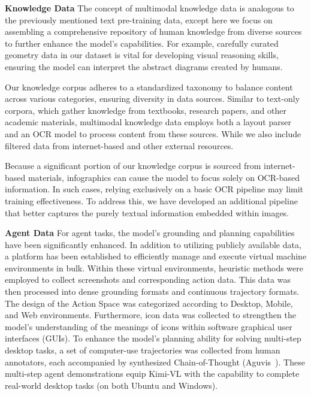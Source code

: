 \documentclass{article}
\newcommand{\ourname}{{Kimi-VL}}
\newcommand{\citep}[1]{\parencite{#1}}
\begin{document}
\textbf{Knowledge Data} The concept of multimodal knowledge data is analogous to the previously mentioned text pre-training data, except here we focus on assembling a comprehensive repository of human knowledge from diverse sources to further enhance the model's capabilities. 
For example, carefully curated geometry data in our dataset is vital for developing visual reasoning skills, ensuring the model can interpret the abstract diagrams created by humans.

Our knowledge corpus adheres to a standardized taxonomy to balance content across various categories, ensuring diversity in data sources. Similar to text-only corpora, which gather knowledge from textbooks, research papers, and other academic materials, multimodal knowledge data employs both a layout parser and an OCR model to process content from these sources. While we also include filtered data from internet-based and other external resources.

Because a significant portion of our knowledge corpus is sourced from internet-based materials, infographics can cause the model to focus solely on OCR-based information. In such cases, relying exclusively on a basic OCR pipeline may limit training effectiveness. To address this, we have developed an additional pipeline that better captures the purely textual information embedded within images.




\textbf{Agent Data}
For agent tasks, the model's grounding and planning capabilities have been significantly enhanced. In addition to utilizing publicly available data, a platform has been established to efficiently manage and execute virtual machine environments in bulk. Within these virtual environments, heuristic methods were employed to collect screenshots and corresponding action data. This data was then processed into dense grounding formats and continuous trajectory formats. The design of the Action Space was categorized according to Desktop, Mobile, and Web environments. Furthermore, icon data was collected to strengthen the model's understanding of the meanings of icons within software graphical user interfaces (GUIs).
To enhance the model's planning ability for solving multi-step desktop tasks, a set of computer-use trajectories was collected from human annotators, each accompanied by synthesized Chain-of-Thought (Aguvis~\citep{xu2024aguvis}). These multi-step agent demonstrations equip \ourname{} with the capability to complete real-world desktop tasks (on both Ubuntu and Windows).
\end{document}
